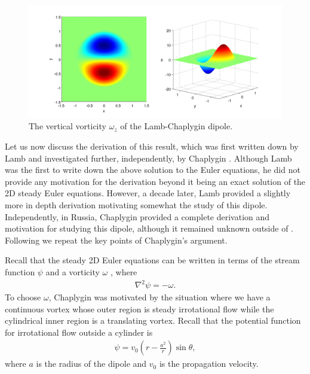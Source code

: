 \begin{figure}
\begin{center}
\includegraphics[width=\textwidth]{lamb_dipole}
\caption{The vertical vorticity $\omega_{z}$ of the Lamb-Chaplygin dipole.}
\label{lamb_dipole_plot}
\end{center}
\end{figure}
Let us now discuss the derivation of this result, which was first written down by Lamb and investigated further, independently, by Chaplygin \cite{meleshko1994}. Although Lamb was the first to write down the above solution to the Euler equations, he did not provide any motivation for the derivation beyond it being an exact solution of the 2D steady Euler equations. However, a decade later, Lamb provided a slightly more in depth derivation motivating somewhat the study of this dipole. Independently, in Russia, Chaplygin provided a complete derivation and motivation for studying this dipole, although it remained unknown outside of . Following \cite{meleshko1994} we repeat the key points of Chaplygin's argument. 

Recall that the steady 2D Euler equations can be written in terms of the stream function $\psi$ and a vorticity $\omega$ , where
\begin{align}
\nabla^{2} \psi = - \omega.\label{vort_eq_chap}
\end{align}
To choose $\omega$, Chaplygin was motivated by the situation where we have a continuous vortex whose outer region is steady irrotational flow while the cylindrical inner region is a translating vortex. Recall that the potential function for irrotational flow outside a cylinder is
\begin{align}
\psi = v_{0}\left(r - \frac{a^{2}}{r}\right)\sin\theta ,
\end{align}
where $a$ is the radius of the dipole and $v_{0}$ is the propagation velocity. 

